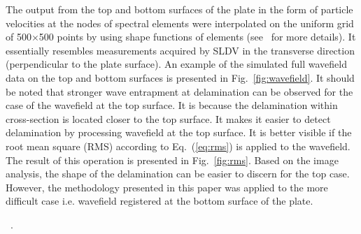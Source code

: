 The output from the top and bottom surfaces of the plate in the form of particle velocities at the nodes of spectral elements were interpolated on the uniform grid of 500\(\times\)500 points by using shape functions of elements (see~\cite{Kudela2020} for more details).
It essentially resembles measurements acquired by SLDV in the transverse direction (perpendicular to the plate surface).
An example of the simulated full wavefield data on the top and bottom surfaces is presented in Fig.~\ref{fig:wavefield}.
It should be noted that stronger wave entrapment at delamination can be observed for the case of the wavefield at the top surface.
It is because the delamination within cross-section is located closer to the top surface.
It makes it easier to detect delamination by processing wavefield at the top surface.
It is better visible if the root mean square (RMS) according to Eq.~(\ref{eq:rms}) is applied to the wavefield.
The result of this operation is presented in Fig.~\ref{fig:rms}.
Based on the image analysis, the shape of the delamination can be easier to discern for the top case.
However, the methodology presented in this paper was applied to the more difficult case i.e. wavefield registered at the bottom surface of the plate.

\DIFaddbegin {}\DIFaddend~\cite{Kudela2020d}.


